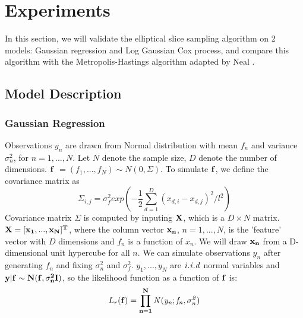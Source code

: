 \documentclass{article}
\begin{document}
\section{Experiments}
In this section, we will validate the elliptical slice sampling algorithm on 2 models: Gaussian regression and Log Gaussian Cox process, and compare this algorithm with the Metropolis-Hastings algorithm adapted by Neal \cite{Neal}.
  
\subsection{Model Description}
\subsubsection{Gaussian Regression}

Observations $y_n$ are drawn from Normal distribution with mean $f_n$ and variance $\sigma_n^2$, for $n = 1,...,N$. Let $N$ denote the sample size, $D$ denote the number of dimensions. $\bf{f}$ $= (f_1,...,f_N) \sim{N(0,\Sigma)}$. To simulate $\bf{f}$, we define the covariance matrix as 
\begin{equation}
\Sigma_{i,j} = \sigma_{f}^{2}exp(-\frac{1}{2}\sum_{d=1}^{D}(x_{d,i} - x_{d,j})^2/l^2)
\end{equation}
Covariance matrix $\Sigma$ is computed by inputing $\bf{X}$, which is a $D\times{N}$ matrix. $\bf{X} = [x_1,...,x_N]^T$, where the column vector $\bf{x_n}$, $n = 1,...,N$, is the 'feature' vector with $D$ dimensions and $f_n$ is a function of $x_n$. We will draw $\bf{x_n}$ from a D-dimensional unit hypercube for all $n$. 
We can simulate observations $y_n$ after generating $f_n$ and fixing $\sigma_{n}^2$ and $\sigma_{f}^2$. $y_1,...,y_N$ are $\it{i.i.d}$ normal variables and $\bf{y|f} \sim{N(\bf{f},\sigma_n^2I)}$, so the likelihood function as a function of $\bf{f}$ is:
\begin{equation}
L_r(\bf{f}) = \prod_{n=1}^{N} \it{N(y_n;f_n,\sigma_n^2)}
\end{equation}
\end{document}
